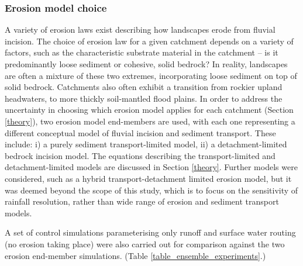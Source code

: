 \subsubsection{Erosion model choice}
A variety of erosion laws exist describing how landscapes erode from fluvial incision. The choice of erosion law for a given catchment depends on a variety of factors, such as the characteristic substrate material in the catchment -- is it predominantly loose sediment or cohesive, solid bedrock? In reality, landscapes are often a mixture of these two extremes, incorporating loose sediment on top of solid bedrock. Catchments also often exhibit a transition from rockier upland headwaters, to more thickly soil-mantled flood plains. In order to address the uncertainty in choosing which erosion model applies for each catchment (Section \ref{theory}), two erosion model end-members are used, with each one representing a different conceptual model of fluvial incision and sediment transport. These include: i) a purely sediment transport-limited model, ii) a detachment-limited bedrock incision model. The equations describing the transport-limited and detachment-limited models are discussed in Section \ref{theory}. Further models were considered, such as a hybrid transport-detachment limited erosion model, but it was deemed beyond the scope of this study, which is to focus on the sensitivity of rainfall resolution, rather than wide range of erosion and sediment transport models. 

A set of control simulations parameterising only runoff and surface water routing (no erosion taking place) were also carried out for comparison against the two erosion end-member simulations. (Table \ref{table_ensemble_experiments}.)


